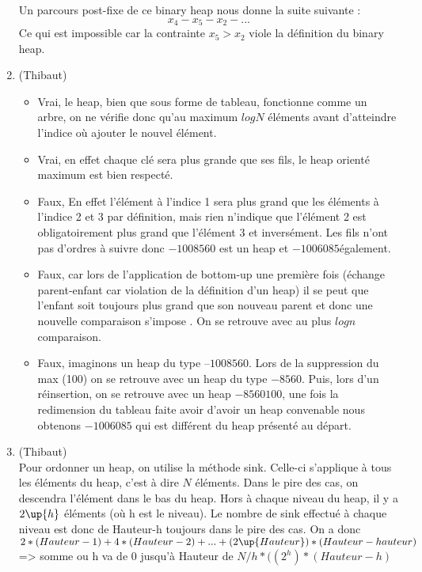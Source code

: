 \documentclass[11pt]{article}
\begin{document}
\begin{enumerate}
Un parcours post-fixe de ce binary heap nous donne la suite suivante :
$$ x_4 - x_5 - x_2 - ... $$
Ce qui est impossible car la contrainte $ x_5 > x_2 $ viole la définition du binary heap.

\item (Thibaut) \begin{itemize}
\item Vrai, le heap, bien que sous forme de tableau, fonctionne comme un arbre, on ne vérifie donc qu'au maximum $log N$ éléments avant d'atteindre l'indice où ajouter le nouvel élément.
\item Vrai, en effet chaque clé sera plus grande que ses fils, le heap orienté maximum est bien respecté.
\item Faux, En effet l'élément à l'indice 1 sera plus grand que les éléments à l'indice 2 et 3 par définition, mais rien n'indique que l'élément 2 est obligatoirement plus grand que l'élément 3 et inversément. Les fils n'ont pas d'ordres à suivre donc  $- 100 85 60$ est un heap et  $- 100 60 85 $également.
\item Faux, car lors de l'application de bottom-up une première fois (échange parent-enfant car violation de la définition d'un heap) il se peut que l'enfant soit toujours plus grand que son nouveau parent et donc une nouvelle comparaison s'impose . On se retrouve avec au plus $log n$ comparaison.
\item Faux, imaginons un heap du type $– 100 85 60$. Lors de la suppression du max (100) on se retrouve avec  un heap du type $- 85 60$. Puis, lors d'un réinsertion, on se retrouve avec un heap $-85 60 100$, une fois la redimension du tableau faite avoir d'avoir un heap convenable nous obtenons $- 100 60 85$ qui est différent du heap présenté au départ.
\end{itemize}
\item (Thibaut)\\Pour ordonner un heap, on utilise la méthode sink. Celle-ci s'applique à tous les éléments du heap, c'est à dire $N$ éléments. Dans le pire des cas, on descendra l'élément dans le bas du heap. Hors à chaque niveau du heap, il y a $2\up{h}$ éléments (où h est le niveau). Le nombre de sink effectué à chaque niveau est donc de Hauteur-h toujours dans le pire des cas. On a donc $2*(Hauteur-1)+4*(Hauteur-2)+...+(2\up{Hauteur})*(Hauteur-hauteur)$ =>  somme ou h va de 0 jusqu'à Hauteur de $N/h*((2^h)*(Hauteur-h)$


\end{enumerate}
\end{document}
